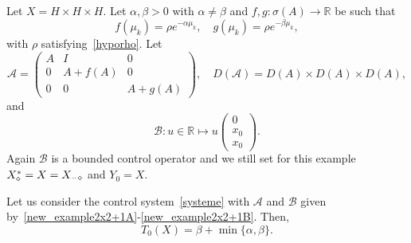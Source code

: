 \documentclass[10pt]{amsart}
\theoremstyle{definition}\newtheorem{defi}[theo]{Definition}\newtheorem{rema}[theo]{Remark}\newtheorem{exam}[theo]{Example}\newtheorem{exem}[theo]{Example}\newtheorem{nota}[theo]{Notation}
\newcommand\A{\mathcal{A}}
\newcommand\B{\mathcal{B}}
\newcommand{\DA}{D(\A)}
\newcommand{\Xalphas}{X_\diamond^*}
\newcommand{\Xmalpha}{X_{-\diamond}}
\newcommand{\Fzp}{Y_0}
\newcommand{\R}{\mathbb{R}}
\begin{document}
Let $X=H\times H\times H$. Let $\alpha,\beta>0$ with $\alpha\neq\beta$ and $f, g : \sigma(A) \to \R$ be such that
\[
f(\mu_k) = \rho e^{-\alpha \mu_k},
\quad g(\mu_k) = \rho e^{-\beta \mu_k},
\]
with $\rho$ satisfying~\eqref{hyporho}. Let
\begin{equation}\label{new_example2x2+1A}
\A=
\begin{pmatrix} A & I & 0 \\ 0 & A+f(A) & 0 \\ 0 & 0 &A+g(A)
\end{pmatrix},
\quad
\DA=D(A)\times D(A)\times D(A),
\end{equation}
and
\begin{equation}\label{new_example2x2+1B}
\B : u \in \R \mapsto u
\begin{pmatrix} 0 \\ x_0 \\ x_0
\end{pmatrix}.
\end{equation}
Again $\B$ is a bounded control operator and we still set for this example $\Xalphas = X\linebreak=\Xmalpha$ and $\Fzp=X$.

\begin{prop}\label{Prop:Academique3}
Let us consider the control system~\eqref{systeme} with $\A$ and $\B$ given by~\eqref{new_example2x2+1A}-\eqref{new_example2x2+1B}. Then,
\[
T_0(X) = \beta + \min\{ \alpha, \beta \}.
\]
\end{prop}
\end{document}
